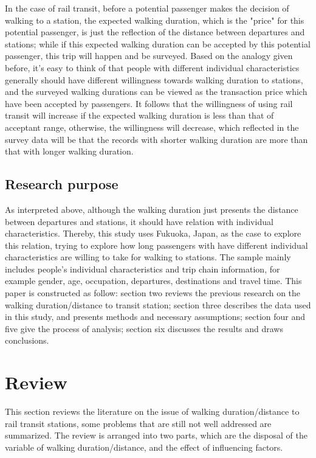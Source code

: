 In the case of rail transit, before a potential passenger makes the decision of walking to a station, the expected walking duration, which is the "price" for this potential passenger, is just the reflection of the distance between departures and stations; while if this expected walking duration can be accepted by this potential passenger, this trip will happen and be surveyed. Based on the analogy given before, it's easy to think of that people with different individual characteristics generally should have different willingness towards walking duration to stations, and the surveyed walking durations can be viewed as the transaction price which have been accepted by passengers. It follows that the willingness of using rail transit will increase if the expected walking duration is less than that of acceptant range, otherwise, the willingness will decrease, which reflected in the survey data will be that the records with shorter walking duration are more than that with longer walking duration. 

\subsection{Research purpose}
As interpreted above, although the walking duration just presents the distance between departures and stations, it should have relation with individual characteristics. Thereby, this study uses Fukuoka, Japan, as the case to explore this relation, trying to explore how long passengers with have different individual characteristics are willing to take for walking to stations. The sample mainly includes people's individual characteristics and trip chain information, for example gender, age, occupation, departures, destinations and travel time. This paper is constructed as follow: section two reviews the previous research on the walking duration/distance to transit station;  section three describes the data used in this study, and presents methods and necessary assumptions; section four and five give the process of analysis; section six discusses the results and draws conclusions. 

%
\section{Review}
This section reviews the literature on the issue of walking duration/distance to rail transit stations, some problems that are still not well addressed are summarized. The review is arranged into two parts, which are the disposal of the variable of walking duration/distance, and the effect of influencing factors.

